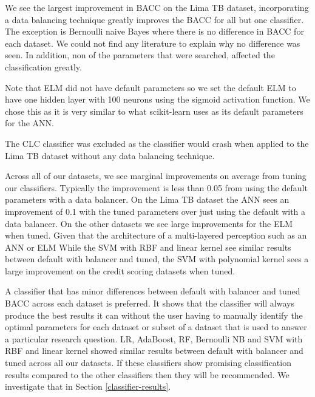\documentclass{sig-alternate-05-2015}
\begin{document}
\begin{table}
{\begin{tabular}{l|l|l|l|l|l|l|l|l|l|l|l|l}
				
		\end{tabular}}
		\vspace{-1em}
	\end{table}
	
	
	We see the largest improvement in BACC on the Lima TB dataset, incorporating a data balancing technique greatly improves the BACC for all but one classifier. The exception is Bernoulli naive Bayes where there is no difference in BACC for each dataset. We could not find any literature to explain why no difference was seen. In addition, non of the parameters that were searched, affected the classification greatly.
	
	Note that ELM did not have default parameters so we set the default ELM to have one hidden layer with 100 neurons using the sigmoid activation function. We chose this as it is very similar to what scikit-learn \cite{scikit-learn} uses as its default parameters for the ANN.
	
	The CLC classifier was excluded as the classifier would crash when applied to the Lima TB dataset without any data balancing technique.
	
	Across all of our datasets, we see marginal improvements on average from tuning our classifiers. Typically the improvement is less than 0.05 from using the default parameters with a data balancer. On the Lima TB dataset the ANN sees an improvement of 0.1 with the tuned parameters over just using the default with a data balancer. On the other datasets we see large improvements for the ELM when tuned. Given that the architecture of a multi-layered perception such as an ANN or ELM  While the SVM with RBF and linear kernel see similar results between default with balancer and tuned, the SVM with polynomial kernel sees a large improvement on the credit scoring datasets when tuned.
	
	A classifier that has minor differences between default with balancer and tuned BACC across each dataset is preferred. It shows that the classifier will always produce the best results it can without the user having to manually identify the optimal parameters for each dataset or subset of a dataset that is used to answer a particular research question. LR, AdaBoost, RF, Bernoulli NB and SVM with RBF and linear kernel showed similar results between default with balancer and tuned across all our datasets. If these classifiers show promising classification results compared to the other classifiers then they will be recommended. We investigate that in Section \ref{classifier-results}.
\end{document}
